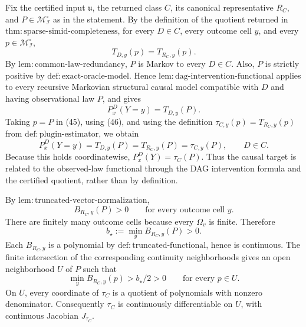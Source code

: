 Fix the certified input \(\mathfrak u\), the returned class \(C\), its canonical representative \(R_C\), and \(P\in\mathcal M_{\mathcal I}^{\circ}\) as in the statement.  By the definition of the quotient returned in \(\mathrm{thm{:}sparse\text{-}simid\text{-}completeness}\), for every \(D\in C\), every outcome cell \(y\), and every \(p\in\mathcal M_{\mathcal I}^{\circ}\),
\[
 T_{D,y}(p)=T_{R_C,y}(p). \tag{45}
\]
By \(\mathrm{lem{:}common\text{-}law\text{-}redundancy}\), \(P\) is Markov to every \(D\in C\).  Also, \(P\) is strictly positive by \(\mathrm{def{:}exact\text{-}oracle\text{-}model}\).  Hence \(\mathrm{lem{:}dag\text{-}intervention\text{-}functional}\) applies to every recursive Markovian structural causal model compatible with \(D\) and having observational law \(P\), and gives
\[
 P_x^D(Y=y)=T_{D,y}(P). \tag{46}
\]
Taking \(p=P\) in (45), using (46), and using the definition \(\tau_{C,y}(p)=T_{R_C,y}(p)\) from \(\mathrm{def{:}plugin\text{-}estimator}\), we obtain
\[
 P_x^D(Y=y)=T_{D,y}(P)=T_{R_C,y}(P)=\tau_{C,y}(P),
 \qquad D\in C. \tag{47}
\]
Because this holds coordinatewise, \(P_x^D(Y)=\tau_C(P)\).  Thus the causal target is related to the observed-law functional through the DAG intervention formula and the certified quotient, rather than by definition.

By \(\mathrm{lem{:}truncated\text{-}vector\text{-}normalization}\),
\[
 B_{R_C,y}(P)>0\qquad\text{for every outcome cell }y. \tag{48}
\]
There are finitely many outcome cells because every \(\Omega_v\) is finite.  Therefore
\[
 b_\star:=\min_y B_{R_C,y}(P)>0. \tag{49}
\]
Each \(B_{R_C,y}\) is a polynomial by \(\mathrm{def{:}truncated\text{-}functional}\), hence is continuous.  The finite intersection of the corresponding continuity neighborhoods gives an open neighborhood \(U\) of \(P\) such that
\[
 \min_y B_{R_C,y}(p)>b_\star/2>0
 \qquad\text{for every }p\in U. \tag{50}
\]
On \(U\), every coordinate of \(\tau_C\) is a quotient of polynomials with nonzero denominator.  Consequently \(\tau_C\) is continuously differentiable on \(U\), with continuous Jacobian \(J_{\tau_C}\).

